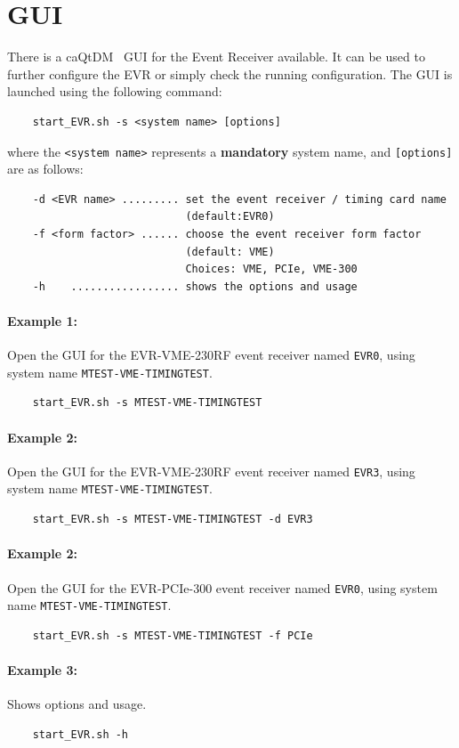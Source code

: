 \documentclass[12pt,a4paper]{article}
\begin{document}
\section{GUI}\label{sec:gui} 
There is a caQtDM~\cite{caqtdm} GUI for the Event Receiver available. It can be used to further configure the EVR or simply check the running configuration. The GUI is launched using the following command:

\begin{verbatim}
	start_EVR.sh -s <system name> [options]
\end{verbatim}
where the \texttt{<system name>} represents a \textbf{mandatory} system name, and \texttt{[options]} are as follows:
\begin{verbatim}
	-d <EVR name> ......... set the event receiver / timing card name 
	                        (default:EVR0)
	-f <form factor> ...... choose the event receiver form factor 
	                        (default: VME)
	                        Choices: VME, PCIe, VME-300
	-h    ................. shows the options and usage
\end{verbatim}


\paragraph{Example 1:} Open the GUI for the EVR-VME-230RF event receiver named \texttt{EVR0}, using system name \texttt{MTEST-VME-TIMINGTEST}.
\begin{verbatim}
	start_EVR.sh -s MTEST-VME-TIMINGTEST
\end{verbatim}

\paragraph{Example 2:} Open the GUI for the EVR-VME-230RF event receiver named \texttt{EVR3}, using system name \texttt{MTEST-VME-TIMINGTEST}.
\begin{verbatim}
	start_EVR.sh -s MTEST-VME-TIMINGTEST -d EVR3
\end{verbatim}

\paragraph{Example 2:} Open the GUI for the EVR-PCIe-300 event receiver named \texttt{EVR0}, using system name \texttt{MTEST-VME-TIMINGTEST}.
\begin{verbatim}
	start_EVR.sh -s MTEST-VME-TIMINGTEST -f PCIe
\end{verbatim}

\paragraph{Example 3:} Shows options and usage.
\begin{verbatim}
	start_EVR.sh -h
\end{verbatim}



\end{document}
